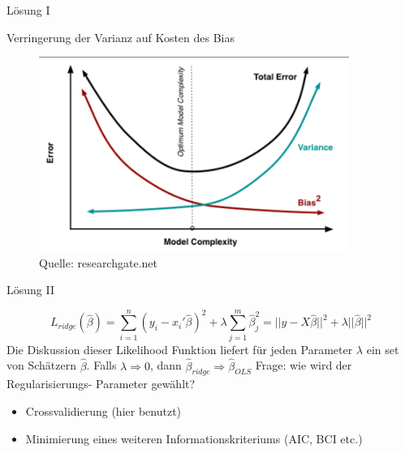 \documentclass[10pt]{beamer}
\begin{document}
\begin{frame}{Lösung I}

    \begin{Large}{Verringerung der Varianz auf Kosten des Bias}\end{Large}

        \begin{figure}
            \centering
            \includegraphics[width=0.9\textwidth]{figures/complexity_error.png}
            \caption{Quelle: researchgate.net}
        \end{figure}
        
\end{frame}

\begin{frame}{Lösung II}

    \begin{equation*}
        L_{ridge}(\hat{\beta})=\sum_{i=1}^{n}(y_{i}-x_{i}'\hat{\beta})^2+\lambda\sum_{j=1}^{m}\hat{\beta}_{j}^2=||y-X\hat{\beta}||^2+\lambda||\hat{\beta}||^2
    \end{equation*}
    Die Diskussion dieser Likelihood Funktion liefert für jeden Parameter $\lambda$ ein set von Schätzern $\hat{\beta}$.
    Falls $\lambda \Rightarrow 0$, dann $\hat{\beta}_{ridge} \Rightarrow \hat{\beta}_{OLS}$
    Frage: wie wird der Regularisierungs- Parameter gewählt?
    \begin{itemize}
        \item Crossvalidierung (hier benutzt)
        \item Minimierung eines weiteren Informationskriteriums (AIC, BCI etc.)
    \end{itemize}
    
\end{frame}
\end{document}

